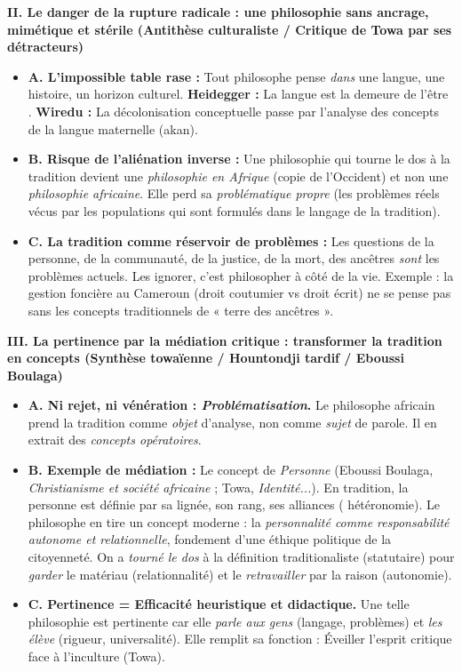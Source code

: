 \documentclass[11pt]{article}
\begin{document}
\begin{exoresolu}
\textbf{II. Le danger de la rupture radicale : une philosophie sans ancrage, mimétique et stérile (Antithèse culturaliste / Critique de Towa par ses détracteurs)}
\begin{itemize}
    \item \textbf{A. L'impossible table rase :} Tout philosophe pense \emph{dans} une langue, une histoire, un horizon culturel. \textbf{Heidegger :} \guillemotleft La langue est la demeure de l'être \guillemotright. \textbf{Wiredu :} La décolonisation conceptuelle passe par l'analyse des concepts de la langue maternelle (akan).
    \item \textbf{B. Risque de l'aliénation inverse :} Une philosophie qui tourne le dos à la tradition devient une \emph{philosophie en Afrique} (copie de l'Occident) et non une \emph{philosophie africaine}. Elle perd sa \emph{problématique propre} (les problèmes réels vécus par les populations qui sont formulés dans le langage de la tradition).
    \item \textbf{C. La tradition comme réservoir de problèmes :} Les questions de la personne, de la communauté, de la justice, de la mort, des ancêtres \emph{sont} les problèmes actuels. Les ignorer, c'est philosopher à côté de la vie. Exemple : la gestion foncière au Cameroun (droit coutumier vs droit écrit) ne se pense pas sans les concepts traditionnels de « terre des ancêtres ».
\end{itemize}

\textbf{III. La pertinence par la médiation critique : transformer la tradition en concepts (Synthèse towaïenne / Hountondji tardif / Eboussi Boulaga)}
\begin{itemize}
    \item \textbf{A. Ni rejet, ni vénération : \emph{Problématisation}.} Le philosophe africain prend la tradition comme \emph{objet} d'analyse, non comme \emph{sujet} de parole. Il en extrait des \emph{concepts opératoires}.
    \item \textbf{B. Exemple de médiation :} Le concept de \emph{Personne} (Eboussi Boulaga, \emph{Christianisme et société africaine} ; Towa, \emph{Identité...}). En tradition, la personne est définie par sa lignée, son rang, ses alliances ( hétéronomie). Le philosophe en tire un concept moderne : la \emph{personnalité comme responsabilité autonome et relationnelle}, fondement d'une éthique politique de la citoyenneté. On a \emph{tourné le dos} à la définition traditionaliste (statutaire) pour \emph{garder} le matériau (relationnalité) et le \emph{retravailler} par la raison (autonomie).
    \item \textbf{C. Pertinence = Efficacité heuristique et didactique.} Une telle philosophie est pertinente car elle \emph{parle aux gens} (langage, problèmes) et \emph{les élève} (rigueur, universalité). Elle remplit sa fonction : \guillemotleft Éveiller l'esprit critique face à l'inculture \guillemotright (Towa).
\end{itemize}


\end{exoresolu}
\end{document}

